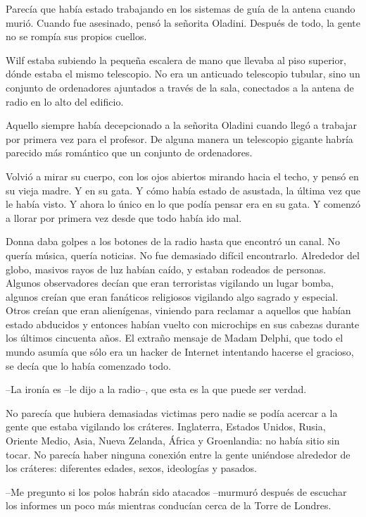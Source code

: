Parecía que había estado trabajando en los sistemas de guía de la antena
cuando murió. Cuando fue asesinado, pensó la señorita Oladini. Después
de todo, la gente no se rompía sus propios cuellos.

Wilf estaba subiendo la pequeña escalera de mano que llevaba al piso
superior, dónde estaba el mismo telescopio. No era un anticuado
telescopio tubular, sino un conjunto de ordenadores ajuntados a través
de la sala, conectados a la antena de radio en lo alto del edificio.

Aquello siempre había decepcionado a la señorita Oladini cuando llegó a
trabajar por primera vez para el profesor. De alguna manera un
telescopio gigante habría parecido más romántico que un conjunto de
ordenadores.

Volvió a mirar su cuerpo, con los ojos abiertos mirando hacia el techo,
y pensó en su vieja madre. Y en su gata. Y cómo había estado de
asustada, la última vez que le había visto. Y ahora lo único en lo que
podía pensar era en su gata. Y comenzó a llorar por primera vez desde
que todo había ido mal.

Donna daba golpes a los botones de la radio hasta que encontró un canal.
No quería música, quería noticias. No fue demasiado difícil encontrarlo.
Alrededor del globo, masivos rayos de luz habían caído, y estaban
rodeados de personas. Algunos observadores decían que eran terroristas
vigilando un lugar bomba, algunos creían que eran fanáticos religiosos
vigilando algo sagrado y especial. Otros creían que eran alienígenas,
viniendo para reclamar a aquellos que habían estado abducidos y entonces
habían vuelto con microchips en sus cabezas durante los últimos
cincuenta años. El extraño mensaje de Madam Delphi, que todo el mundo
asumía que sólo era un hacker de Internet intentando hacerse el
gracioso, se decía que lo había comenzado todo.

--La ironía es --le dijo a la radio--, que esta es la que puede ser
verdad.

No parecía que hubiera demasiadas victimas pero nadie se podía acercar a
la gente que estaba vigilando los cráteres. Inglaterra, Estados Unidos,
Rusia, Oriente Medio, Asia, Nueva Zelanda, África y Groenlandia: no
había sitio sin tocar. No parecía haber ninguna conexión entre la gente
uniéndose alrededor de los cráteres: diferentes edades, sexos,
ideologías y pasados.

--Me pregunto si los polos habrán sido atacados --murmuró después de
escuchar los informes un poco más mientras conducían cerca de la Torre
de Londres.

